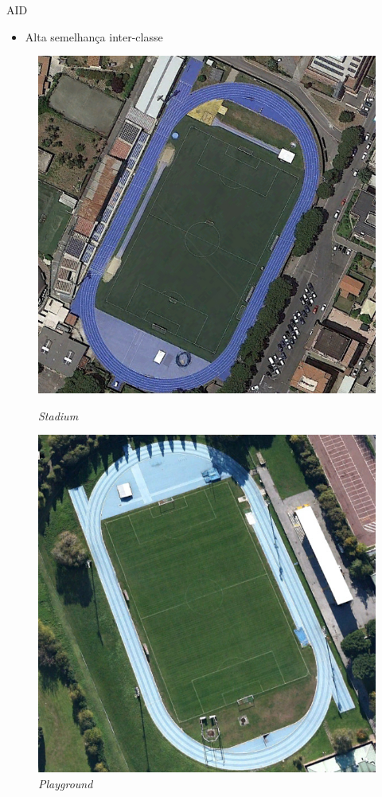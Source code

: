     \begin{frame}{AID}
        \begin{itemize}
            \item Alta semelhança inter-classe
        \end{itemize}

        \begin{figure}
            \begin{minipage}[b]{0.4\linewidth}
                \centering
                \includegraphics[width=0.9\linewidth]{AID/stadium_247.jpg}
                \caption{\textit{Stadium}}
            \end{minipage}
            \hspace{0.1cm}
            \begin{minipage}[b]{0.4\linewidth}
                \centering
                \includegraphics[width=0.9\linewidth]{AID/playground_184.jpg}
                \caption{\textit{Playground}}
            \end{minipage}
            
        \end{figure}
    \end{frame}
            